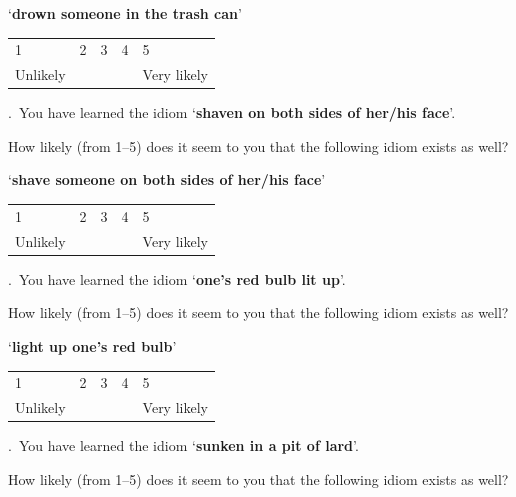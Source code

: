 \documentclass[output=paper]{langsci/langscibook}
\begin{document}
\begin{paperappendix}
{\noindent \enquote*{\textbf{drown someone in the trash can}}\vspace{.5\baselineskip}

\noindent \begin{tabularx}{\textwidth}{XXXXX}
        1 & 2 & 3 & 4 & 5\\
        Unlikely & & & & Very likely\\
        \end{tabularx}\vspace{1\baselineskip}


.\ You have learned the idiom \enquote*{\textbf{shaven on both sides of
    her/his face}}.

\noindent How likely (from 1--5) does it seem to you that the following idiom exists
    as well?\vspace{.5\baselineskip}

\noindent \enquote*{\textbf{shave someone on both sides of her/his face}}\vspace{.5\baselineskip}

\noindent \begin{tabularx}{\textwidth}{XXXXX}
        1 & 2 & 3 & 4 & 5\\
        Unlikely & & & & Very likely\\
        \end{tabularx}\vspace{1\baselineskip}

.\ You have learned the idiom \enquote*{\textbf{one's red bulb lit up}}.


\noindent How likely (from 1--5) does it seem to you that the following idiom exists
    as well?\vspace{.5\baselineskip}

\noindent \enquote*{\textbf{light up one's red bulb}}\vspace{.5\baselineskip}

\noindent \begin{tabularx}{\textwidth}{XXXXX}
        1 & 2 & 3 & 4 & 5\\
        Unlikely & & & & Very likely\\
        \end{tabularx}\vspace{1\baselineskip}

.\ You have learned the idiom \enquote*{\textbf{sunken in a pit of lard}}.

\noindent How likely (from 1--5) does it seem to you that the following idiom exists
    as well?\vspace{.5\baselineskip}

}
\end{paperappendix}
\end{document}
